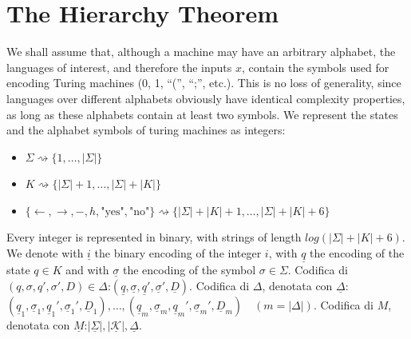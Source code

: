 \documentclass[12pt]{article}
\newcommand{\ra}{\rightarrow}
\newcommand{\la}{\leftarrow}
\begin{document}
\section{The Hierarchy Theorem}
We shall assume that, although a machine may have an arbitrary alphabet, the languages of interest, and therefore the inputs $x$, contain the symbols used for encoding Turing machines (0, 1, ``('', ``;'', etc.). This is no loss of generality, since languages over different alphabets obviously have identical complexity properties, as long as these alphabets contain at least two symbols. We represent the states and the alphabet symbols of turing machines as integers:
\begin{itemize}
\item$\Sigma\rightsquigarrow\{1,\dots,|\Sigma|\}$
\item $K\rightsquigarrow\{|\Sigma|+1,\dots,|\Sigma|+|K|\}$
\item $\{\la,\ra,-,h,\text{"yes"},\text{"no"}\}\rightsquigarrow\{|\Sigma|+|K|+1,\dots,|\Sigma|+|K|+6\}$ 
\end{itemize}
Every integer is represented in binary, with strings of length $log(|\Sigma|+|K|+6)$. We denote with $\underline i$ the binary encoding of the integer $i$, with $\underline q$ the encoding of the state $q\in K$ and with $\underline\sigma$ the encoding of the symbol $\sigma\in\Sigma$.
Codifica di $(q, \sigma, q', \sigma', D) \in \Delta$:$(\underline q,\underline \sigma,\underline q',\underline \sigma',\underline D)$.
 Codifica di  $\Delta$, denotata con $\underline\Delta$:$ (\underline q_1,\underline \sigma_1,\underline q_1',\underline \sigma_1',\underline D_1), \dots, (\underline q_m,\underline \sigma_m,\underline q_m',\underline \sigma_m',\underline D_m) \quad (m = |\Delta|)$. Codifica di $M$, denotata con $\underline M$:$  |\underline\Sigma|, |\mathcal{\underline K}|,\underline \Delta$.
 
\end{document}
